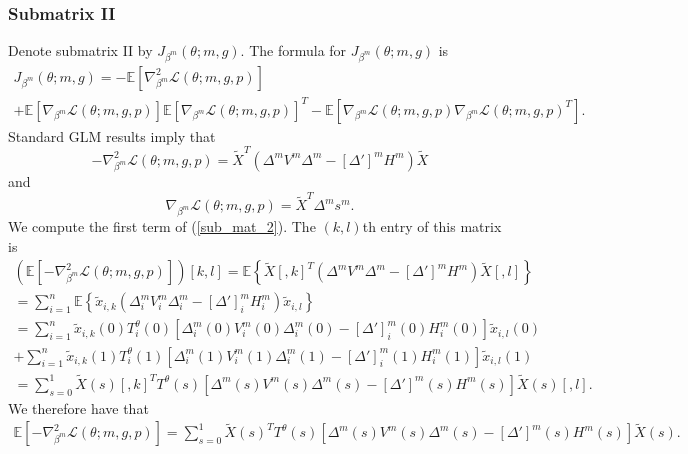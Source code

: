\documentclass[12pt]{article}
\begin{document}
\begin{appendices}
\begin{refsection}
		\subsubsection*{Submatrix II}
		Denote submatrix II by $J_{\beta^m}(\theta; m, g).$ The formula for $J_{\beta^m}(\theta; m, g)$ is
		\begin{multline}\label{sub_mat_2}
		J_{\beta^m}(\theta; m, g) = -\mathbb{E} \left[\nabla_{\beta^m}^2 \mathcal{L}(\theta; m, g, p) \right] \\ + \mathbb{E}\left[\nabla_{\beta^m} \mathcal{L}(\theta; m, g, p) \right] \mathbb{E}\left[ \nabla_{\beta^m} \mathcal{L}(\theta; m, g, p) \right]^T - \mathbb{E}\left[ \nabla_{\beta^m} \mathcal{L}(\theta; m, g, p) \nabla_{\beta^m} \mathcal{L}(\theta; m, g, p)^T  \right].
		\end{multline}
		Standard GLM results imply that
		$$ -\nabla_{\beta^m}^2 \mathcal{L}(\theta; m, g, p) = \tilde{X}^T ( \Delta^m V^m \Delta^m - [\Delta']^m H^m ) \tilde{X}$$ and $$\nabla_{\beta^m}\mathcal{L}(\theta; m, g, p) = \tilde{X}^T \Delta^m s^m.$$
		We compute the first term of (\ref{sub_mat_2}). The $(k,l)$th entry of this matrix is
		\begin{multline*}
		\left( \mathbb{E}\left[-\nabla_{\beta^m}^2 \mathcal{L}(\theta; m, g, p)\right]\right)[k,l] = \mathbb{E} \left\{\tilde{X}[,k]^T (\Delta^m V^m \Delta^m - [\Delta']^mH^m) \tilde{X}[,l] \right\} \\ = \sum_{i=1}^n \mathbb{E} \left\{ \tilde{x}_{i,k} (\Delta^m_{i} V^m_{i} \Delta^m_{i} - [\Delta']^m_{i} H^m_{i}) \tilde{x}_{i,l} \right\} \\ = \sum_{i=1}^n \tilde{x}_{i,k}(0) T_i^{\theta}(0) [{\Delta}^m_i(0)  {V}^m_i(0) {\Delta}^m_i(0) - [\Delta']^m_i(0) {H}^m_i(0)] \tilde{x}_{i,l}(0) \\ + \sum_{i=1}^n \tilde{x}_{i,k}(1) T_i^{\theta}(1) [ {\Delta}^m_i(1)  {V}^m_i(1) {\Delta}^m_i(1) - [{\Delta}']^m_i(1) {H}^m_i(1)] \tilde{x}_{i,l}(1) \\ = \sum_{s = 0}^1 \tilde{X}(s)[,k]^T {T}^{\theta}(s) \left[ {\Delta}^m(s) {V}^m(s) {\Delta}^m(s) - [{\Delta}']^m(s) {H}^m(s) \right] \tilde{X}(s)[,l].
		\end{multline*}
		We therefore have that
		\begin{multline}\label{sub_mat_2_1}
		\mathbb{E}\left[-\nabla_{\beta^m}^2 \mathcal{L}(\theta; m, g, p)\right] = \sum_{s=0}^1 \tilde{X}(s)^T T^{\theta}(s) \left[ {\Delta}^m(s) {V}^m(s) {\Delta}^m(s) - [{\Delta}']^m(s) {H}^m(s) \right] \tilde{X}(s).
		\end{multline}

\end{refsection}
\end{appendices}
\end{document}
